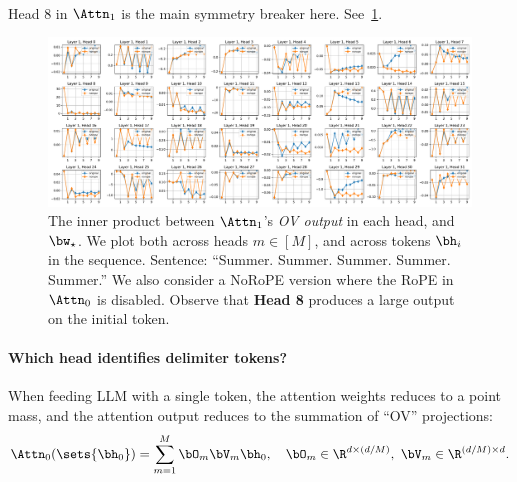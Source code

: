 ~

Head 8 in $\Attn_1$ is the main symmetry breaker here. See~\cref{fig:attn1-heads-rope}.

\begin{figure}[H]
    \centering
    \includegraphics[width=\textwidth]{Figures/attn_0/attn_1_inner_prod_wstar.pdf}
    \caption{\small The inner product between $\Attn_1$'s \emph{OV output} in each head, and $\bw_\star$. We plot both across heads $m\in[M]$, and across tokens $\bh_i$ in the sequence. Sentence: ``Summer. Summer. Summer. Summer. Summer.'' We also consider a NoRoPE version where the RoPE in $\Attn_0$ is disabled. Observe that {\bf Head 8} produces a large output on the initial token.}
    \label{fig:attn1-heads-rope}
\end{figure}



\paragraph{Which head identifies delimiter tokens?}

When feeding LLM with a single token, the attention weights reduces to a point mass, and the attention output reduces to the summation of ``OV'' projections:
\begin{align}
    \Attn_0(\sets{\bh_0}) = \sum_{m=1}^M \bO_m\bV_m \bh_0, \quad \bO_m\in\R^{d\times (d/M)},~\bV_m\in\R^{(d/M)\times d}.
\end{align}

